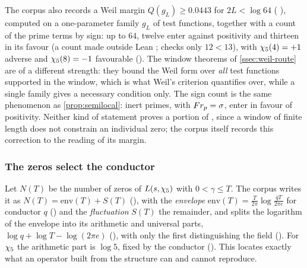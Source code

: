 \begin{remark}\label{rmk:earlier-window}
The corpus also records a Weil margin $Q(g_L)\ge0.0443$ for $2L<\log64$
( ), computed on a one-parameter family $g_L$ of
test functions, together with a count of the prime terms by sign: up to $64$,
twelve enter against positivity and thirteen in its favour (a count made outside
Lean ;  checks only $12<13$), with $\chi_5(4)=+1$ adverse and
$\chi_5(8)=-1$ favourable ().  The window theorems of
\cref{ssec:weil-route} are of a different strength: they bound the Weil form over
\emph{all} test functions supported in the window, which is what Weil's criterion
quantifies over, while a single family gives a necessary condition only.  The sign
count is the same phenomenon as \cref{prop:semilocal}: inert primes, with
$Fr_p=\sigma$, enter in favour of positivity.  Neither kind of statement proves
a portion of \Ecore, since a window of finite length does not constrain an
individual zero; the corpus itself records this correction to the reading of its
margin.
\end{remark}

\subsubsection{The zeros select the conductor}\label{ssec:envelope-fluctuation}

Let $N(T)$ be the number of zeros of $L(s,\chi_5)$ with $0<\gamma\le T$.  The corpus writes it as
$N(T)=\mathrm{env}(T)+S(T)$ (), with the \emph{envelope}
$\mathrm{env}(T)=\frac T{2\pi}\log\frac{qT}{2\pi e}$ for conductor $q$ () and the
\emph{fluctuation} $S(T)$ the remainder, and splits the logarithm of the envelope into its arithmetic and universal
parts, $\log q+\log T-\log(2\pi e)$ (), with only
the first distinguishing the field ().  For
$\chi_5$ the arithmetic part is $\log5$, fixed by the conductor
().  This locates exactly what an operator
built from the structure can and cannot reproduce.

